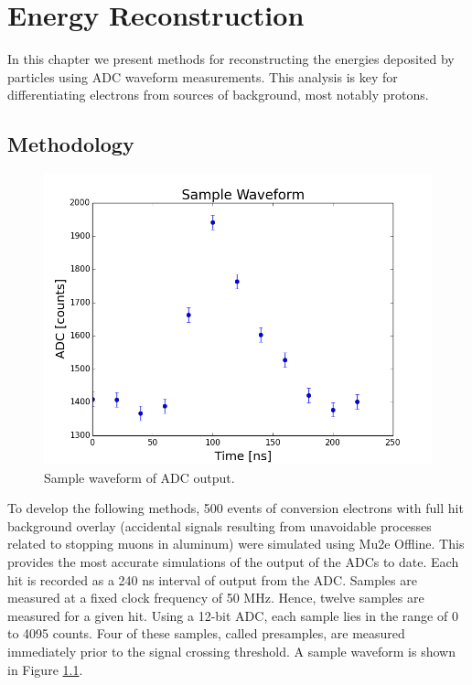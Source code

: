 %
%
\chapter{Energy Reconstruction}\label{ch:implem}

In this chapter we present methods for reconstructing the energies deposited by particles using ADC waveform measurements. This analysis is key for differentiating electrons from sources of background, most notably protons.

\section{Methodology}

\begin{figure}[htp!]
    \centering
    \includegraphics[scale=0.5]{Images2/sampleWaveform.png}
    \caption{Sample waveform of ADC output.}
    \label{fig:sampleWaveform}
\end{figure} 
To develop the following methods, 500 events of conversion electrons with full hit background overlay (accidental signals resulting from unavoidable processes related to stopping muons in aluminum) were simulated using Mu2e Offline. This provides the most accurate simulations of the output of the ADCs to date. Each hit is recorded as a 240 ns interval of output from the ADC. Samples are measured at a fixed clock frequency of 50 MHz. Hence, twelve samples are measured for a given hit. Using a 12-bit ADC, each sample lies in the range of 0 to 4095 counts. Four of these samples, called presamples, are measured immediately prior to the signal crossing threshold. A sample waveform is shown in Figure \ref{fig:sampleWaveform}. 


